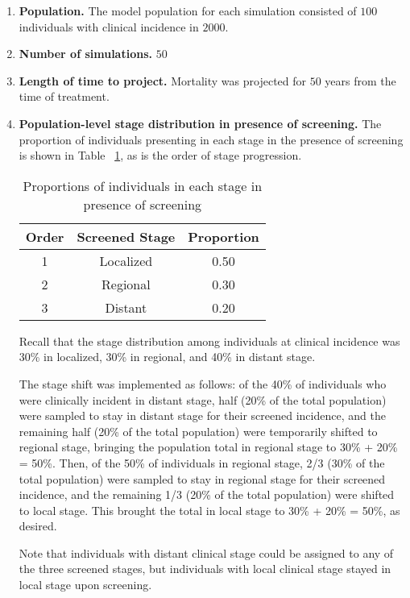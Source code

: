 \documentclass[11pt]{article}
\begin{document}
\begin{enumerate}
    \item \textbf{Population.} The model population for each simulation consisted of $100$ individuals with clinical incidence in $2000$.

    \item \textbf{Number of simulations.} $50$ 

    \item \textbf{Length of time to project.} Mortality was projected for $50$ years from the time of treatment.

    \item \textbf{Population-level stage distribution in presence of screening.} The proportion of individuals presenting in each stage in the presence of screening is shown in Table ~\ref{tab:scrdist}, as is the order of stage progression. 


\begin{table}[!ht]
\centering
\begin{tabular}{ccc}
  \hline
Order & Screened Stage & Proportion \\ 
  \hline
  1 & Localized & 0.50 \\ 
    2 & Regional & 0.30 \\ 
    3 & Distant & 0.20 \\ 
   \hline
\end{tabular}
\caption{Proportions of individuals in each stage in presence of screening} 
\label{tab:scrdist}
\end{table}
    Recall that the stage distribution among individuals at clinical incidence was 30\% in localized, 30\% in regional, and 40\% in distant stage.

    The stage shift was implemented as follows: of the 40\% of individuals who were clinically incident in distant stage, half (20\% of the total population) were sampled to stay in distant stage for their screened incidence, and the remaining half (20\% of the total population) were temporarily shifted to regional stage, bringing the population total in regional stage to 30\% + 20\% = 50\%.
    Then, of the 50\% of individuals in regional stage, 2/3 (30\% of the total population) were sampled to stay in regional stage for their screened incidence, and the remaining 1/3 (20\% of the total population) were shifted to local stage.
    This brought the total in local stage to 30\% + 20\% = 50\%, as desired.

    Note that individuals with distant clinical stage could be assigned to any of the three screened stages, but individuals with local clinical stage stayed in local stage upon screening.


\end{enumerate}
\end{document}
